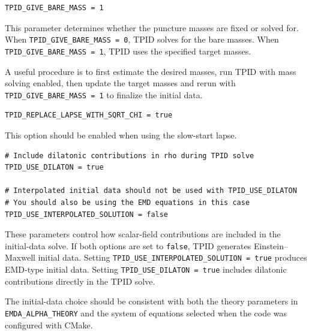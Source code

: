 \begin{verbatim}
TPID_GIVE_BARE_MASS = 1
\end{verbatim}

This parameter determines whether the puncture masses are fixed or solved for.
When \texttt{TPID\_GIVE\_BARE\_MASS = 0}, TPID solves for the bare masses. When
\texttt{TPID\_GIVE\_BARE\_MASS = 1}, TPID uses the specified target masses.

A useful procedure is to first estimate the desired masses, run TPID with mass
solving enabled, then update the target masses and rerun with
\texttt{TPID\_GIVE\_BARE\_MASS = 1} to finalize the initial data.

\begin{verbatim}
TPID_REPLACE_LAPSE_WITH_SQRT_CHI = true
\end{verbatim}

This option should be enabled when using the slow-start lapse.

\begin{verbatim}
# Include dilatonic contributions in rho during TPID solve
TPID_USE_DILATON = true

# Interpolated initial data should not be used with TPID_USE_DILATON
# You should also be using the EMD equations in this case
TPID_USE_INTERPOLATED_SOLUTION = false
\end{verbatim}

These parameters control how scalar-field contributions are included in the
initial-data solve. If both options are set to \texttt{false}, TPID generates
Einstein--Maxwell initial data. Setting
\texttt{TPID\_USE\_INTERPOLATED\_SOLUTION = true} produces EMD-type initial
data. Setting \texttt{TPID\_USE\_DILATON = true} includes dilatonic
contributions directly in the TPID solve.

The initial-data choice should be consistent with both the theory parameters in
\texttt{EMDA\_ALPHA\_THEORY} and the system of equations selected when the code
was configured with CMake.
